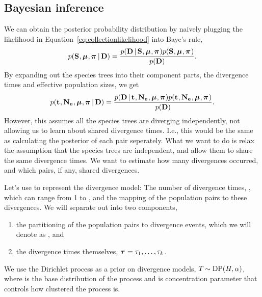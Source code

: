 \subsection{Bayesian inference}

We can obtain the posterior probability distribution by naively plugging the
likelihood in Equation~\ref{eq:collectionlikelihood} into Baye's rule,
\begin{equation}
    \pr(
    \sptrees,
    \murates,
    \gfreqs
    \given
    \alldata
    )
    =
    \frac{
        \pr(
        \alldata
        \given
        \sptrees, \murates, \gfreqs
        )
        \pr(
        \sptrees,
        \murates,
        \gfreqs
        )
    }{
        \pr(
        \alldata
        )
    }.
    \label{eq:collectionindependentbayesrule}
\end{equation}
By expanding out the species trees into their component parts, the divergence
times and effective population sizes, we get
\begin{equation}
    \pr(
    \comparisondivtimes,
    \collectionpopsizes,
    \murates,
    \gfreqs
    \given
    \alldata
    )
    =
    \frac{
        \pr(
        \alldata
        \given
        \comparisondivtimes,
        \collectionpopsizes,
        \murates,
        \gfreqs
        )
        \pr(\comparisondivtimes, \collectionpopsizes, \murates, \gfreqs)
    }{
        \pr(
        \alldata
        )
    }.
    \label{eq:collectionindependentbayesruleexpanded}
\end{equation}
However, this assumes all the species trees are diverging independently, not allowing us
to learn about shared divergence times.
I.e., this would be the same as calculating the posterior of each pair
seperately.
What we want to do is relax the assumption that the species trees are
independent, and allow them to share the same divergence times.
We want to estimate how many divergences occurred, and which pairs, if any,
shared divergences.

Let's use \divtimemodel to represent the divergence model: The number of
divergence times, \nevents, which can range from 1 to \ncomparisons, and the
mapping of the population pairs to these \nevents divergences.
We will separate out \divtimemodel into two components,
\begin{enumerate}
    \item the partitioning of the \ncomparisons population pairs to
        divergence events, which we will denote as \divtimesets, and
    \item the divergence times themselves,
        $\divtimes = \divtime[1], \ldots, \divtime[\nevents]$.
\end{enumerate}
We use the Dirichlet process as a prior on divergence models,
$\divtimemodel \sim \dirp(\basedistribution, \concentration)$,
where \basedistribution is the base distribution of the process and
\concentration is concentration parameter that controls how clustered the
process is.

